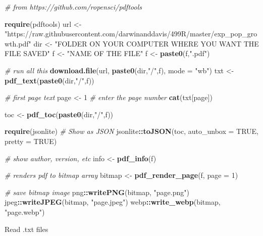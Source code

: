 \documentclass[10,portrait]{article}
\newenvironment{Shaded}{\begin{snugshade}}{\end{snugshade}}
\newcommand{\KeywordTok}[1]{\textcolor[rgb]{0.13,0.29,0.53}{\textbf{#1}}}
\newcommand{\DataTypeTok}[1]{\textcolor[rgb]{0.13,0.29,0.53}{#1}}
\newcommand{\DecValTok}[1]{\textcolor[rgb]{0.00,0.00,0.81}{#1}}
\newcommand{\StringTok}[1]{\textcolor[rgb]{0.31,0.60,0.02}{#1}}
\newcommand{\CommentTok}[1]{\textcolor[rgb]{0.56,0.35,0.01}{\textit{#1}}}
\newcommand{\OtherTok}[1]{\textcolor[rgb]{0.56,0.35,0.01}{#1}}
\newcommand{\OperatorTok}[1]{\textcolor[rgb]{0.81,0.36,0.00}{\textbf{#1}}}
\newcommand{\NormalTok}[1]{#1}
\begin{document}
\begin{Shaded}
\begin{Highlighting}[]
\CommentTok{# from https://github.com/ropensci/pdftools}

\KeywordTok{require}\NormalTok{(pdftools)}
\NormalTok{url <-}\StringTok{ "https://raw.githubusercontent.com/darwinanddavis/499R/master/exp_pop_growth.pdf"}
\NormalTok{dir <-}\StringTok{ "FOLDER ON YOUR COMPUTER WHERE YOU WANT THE FILE SAVED"}
\NormalTok{f <-}\StringTok{ "NAME OF THE FILE"} 
\NormalTok{f <-}\StringTok{ }\KeywordTok{paste0}\NormalTok{(f,}\StringTok{".pdf"}\NormalTok{) }

\CommentTok{# run all this}
\KeywordTok{download.file}\NormalTok{(url, }\KeywordTok{paste0}\NormalTok{(dir,}\StringTok{"/"}\NormalTok{,f), }\DataTypeTok{mode =} \StringTok{"wb"}\NormalTok{)}
\NormalTok{txt <-}\StringTok{ }\KeywordTok{pdf_text}\NormalTok{(}\KeywordTok{paste0}\NormalTok{(dir,}\StringTok{"/"}\NormalTok{,f))}

\CommentTok{# first page text}
\NormalTok{page <-}\StringTok{ }\DecValTok{1} \CommentTok{# enter the page number}
\KeywordTok{cat}\NormalTok{(txt[page])}

\NormalTok{toc <-}\StringTok{ }\KeywordTok{pdf_toc}\NormalTok{(}\KeywordTok{paste0}\NormalTok{(dir,}\StringTok{"/"}\NormalTok{,f))}

\KeywordTok{require}\NormalTok{(jsonlite)}
\CommentTok{# Show as JSON}
\NormalTok{jsonlite}\OperatorTok{::}\KeywordTok{toJSON}\NormalTok{(toc, }\DataTypeTok{auto_unbox =} \OtherTok{TRUE}\NormalTok{, }\DataTypeTok{pretty =} \OtherTok{TRUE}\NormalTok{)}

\CommentTok{# show author, version, etc}
\NormalTok{info <-}\StringTok{ }\KeywordTok{pdf_info}\NormalTok{(f)}

\CommentTok{# renders pdf to bitmap array}
\NormalTok{bitmap <-}\StringTok{ }\KeywordTok{pdf_render_page}\NormalTok{(f, }\DataTypeTok{page =} \DecValTok{1}\NormalTok{)}

\CommentTok{# save bitmap image}
\NormalTok{png}\OperatorTok{::}\KeywordTok{writePNG}\NormalTok{(bitmap, }\StringTok{"page.png"}\NormalTok{)}
\NormalTok{jpeg}\OperatorTok{::}\KeywordTok{writeJPEG}\NormalTok{(bitmap, }\StringTok{"page.jpeg"}\NormalTok{)}
\NormalTok{webp}\OperatorTok{::}\KeywordTok{write_webp}\NormalTok{(bitmap, }\StringTok{"page.webp"}\NormalTok{)}
\end{Highlighting}
\end{Shaded}

Read .txt files
\end{document}
